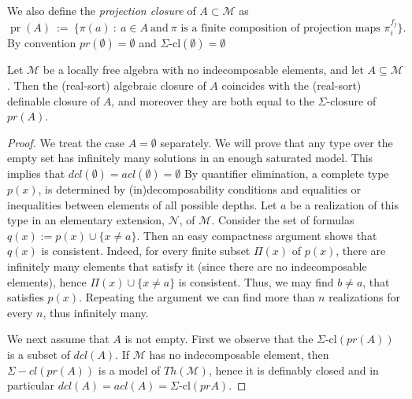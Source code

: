 \documentclass[a4paper,11pt]{article}
\begin{document}
We also define the {\em projection closure} of $A\subset \mathcal{M}$ as 
\[
\operatorname{pr}(A)\ :=\ \bigl\{\pi(a)\ :\ a\in A\ \text{and}\ \pi \text{ is a finite composition of projection maps } \pi_i^{f_j}\bigr\}.
\]
By convention $pr(\emptyset)=\emptyset$ and $\Sigma\text{-}\mathrm{cl}(\emptyset)=\emptyset$
\begin{lemma}\label{algclosureind}
Let $\mathcal{M}$ be a locally free algebra with no indecomposable elements, and let $A\subseteq \mathcal{M}$. 
Then the (real-sort) algebraic closure of $A$ coincides with the (real-sort) definable closure of $A$, and moreover they are both equal to the $\Sigma$-closure of $pr(A)$.
\end{lemma}
\begin{proof}
We treat the case $A=\emptyset$ separately. We will prove that any type over the empty set has infinitely many solutions in an enough saturated model. This implies that $dcl(\emptyset)=acl(\emptyset)=\emptyset$ By quantifier elimination, a complete type $p(x)$, is determined by (in)decomposability conditions and equalities or inequalities between elements of all possible depths. Let $a$ be a realization of this type in an elementary extension, $\mathcal{N}$, of $\mathcal{M}$. Consider the set of formulas $q(x):=p(x)\cup \{x\neq a\}$. Then an easy compactness argument shows that $q(x)$ is consistent. Indeed, for every finite subset $\Pi(x)$ of $p(x)$, there are infinitely many elements that satisfy it (since there are no indecomposable elements), hence $\Pi(x)\cup\{x\neq a\}$ is consistent. Thus, we may find $b\neq a$, that satisfies $p(x)$. Repeating the argument we can find more than $n$ realizations for every $n$, thus infinitely many.   

We next assume that $A$ is not empty. 
First we observe that the $\Sigma\text{-}\mathrm{cl}(pr(A))$ is a subset of $dcl(A)$. If $\mathcal{M}$ has no indecomposable element, then $\Sigma-cl(pr(A))$ is a model of $Th(\mathcal{M})$, hence it is definably closed and in particular $dcl(A)=acl(A)=\Sigma\text{-}\mathrm{cl}(prA)$. 
\end{proof}
\end{document}
